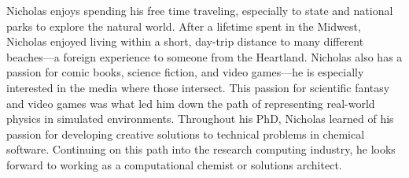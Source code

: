 Nicholas enjoys spending his free time traveling, especially to state and national parks to explore the natural world.
After a lifetime spent in the Midwest, Nicholas enjoyed living within a short, day-trip distance to many different beaches---a foreign experience to someone from the Heartland.
Nicholas also has a passion for comic books, science fiction, and video games---he is especially interested in the media where those intersect.
This passion for scientific fantasy and video games was what led him down the path of representing real-world physics in simulated environments.
Throughout his PhD, Nicholas learned of his passion for developing creative solutions to technical problems in chemical software. 
Continuing on this path into the research computing industry, he looks forward to working as a computational chemist or solutions architect.
